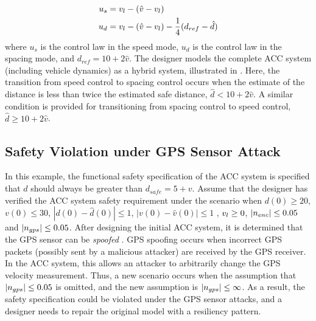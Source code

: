 \begin{align}
u_s & = v_{l} - (\hat{v}-v_{l}) \nonumber \\
u_d & = v_{l} - (\hat{v}-v_{l}) - \frac{1}{4} (d_{ref} - \hat{d})
\end{align}
%
%
where $u_s$ is the control law in the speed mode, $u_d$ is the control law in the spacing mode, and $d_{ref} = 10 + 2\hat{v}$. %
%
The designer models the complete ACC system (including vehicle dynamics) as a hybrid system, illustrated in . Here, the transition from speed control to spacing control occurs when the estimate of the distance is less than twice the estimated safe distance, \ie $\hat{d} < 10 + 2\hat{v}$. A similar condition is provided for transitioning from spacing control to speed control, \ie $\hat{d} \geq 10 + 2\hat{v}$.
%
%
%

\subsection{Safety Violation under GPS Sensor Attack}
%
In this example, the functional safety specification of the ACC system is specified that $d$ should always be greater than $d_{safe} = 5 + v$. Assume that the designer has verified the ACC system safety requirement under the scenario when $d(0) \geq 20$, $v(0) \leq 30$, $|d(0) - \hat{d}(0)| \leq 1$, $|v(0) - \hat{v}(0)| \leq 1$ , $v_{l} \geq 0$, $|n_{enc}| \leq 0.05$ and $|n_{gps}| \leq 0.05$.
%
After designing the initial ACC system, it is determined that the GPS sensor can be \emph{spoofed} \cite{tippenhauer2011requirements, kerns2014unmanned}. GPS spoofing occurs when incorrect GPS packets (possibly sent by a malicious attacker) are received by the GPS receiver. In the ACC system, this allows an attacker to arbitrarily change the GPS velocity measurement.
%
Thus, a new scenario occurs when the assumption that $|n_{gps}| \leq 0.05$ is omitted, and the new assumption is $|n_{gps}| \leq \infty$.
As a result, the safety specification could be violated under the GPS sensor attacks, and a designer needs to repair the original model with a resiliency pattern.

